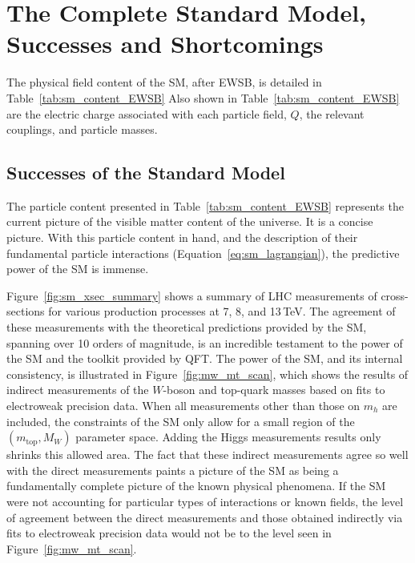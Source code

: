 \section{The Complete Standard Model, Successes and Shortcomings}
\label{sec:final_sm_description}

The physical field content of the SM, after EWSB, is detailed in Table~\ref{tab:sm_content_EWSB}
Also shown in Table~\ref{tab:sm_content_EWSB} are the electric charge associated with each
particle field, $Q$, the relevant couplings, and particle masses.



%
%

\subsection{Successes of the Standard Model}
\label{sec:sm_successes}

The particle content presented in Table~\ref{tab:sm_content_EWSB} represents the current
picture of the visible matter content of the universe.
It is a concise picture.
With this particle content in hand, and the description of their fundamental particle interactions (Equation~\ref{eq:sm_lagrangian}),
the predictive power of the SM is immense.

Figure~\ref{fig:sm_xsec_summary} shows a summary of LHC measurements of cross-sections
for various production processes at 7, 8, and 13\,TeV.
The agreement of these measurements with the theoretical predictions provided by the SM, spanning over 10 orders of magnitude,
is an incredible testament to the power of the SM and the toolkit provided by QFT.
The power of the SM, and its internal consistency, is illustrated in Figure~\ref{fig:mw_mt_scan},
which shows the results of indirect measurements of the $W$-boson and top-quark masses based
on fits to electroweak precision data.
When all measurements other than those on $m_h$ are included, the constraints of the SM
only allow for a small region of the $(m_{\text{top}}, M_W)$ parameter space.
Adding the Higgs measurements results only shrinks this allowed area.
The fact that these indirect measurements agree so well with the direct measurements paints a picture
of the SM as being a fundamentally complete picture of the known physical phenomena.
If the SM were not accounting for particular types of interactions or known fields,
the level of agreement between the direct measurements and those obtained indirectly via
fits to electroweak precision data would not be to the level seen in Figure~\ref{fig:mw_mt_scan}.

